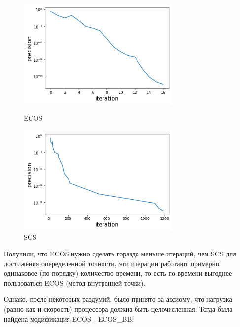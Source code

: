 \documentclass{article}
\begin{document}
\begin{figure}[h]
\begin{center}
\begin{minipage}[h]{8cm}
\includegraphics[width=8cm]{ECOS_1.png}
\caption{ECOS} %
\label{ris:experimoriginal} %
\end{minipage}
\hfill 
\begin{minipage}[h]{8cm}
\includegraphics[width=8cm]{SCS_1.png}
\caption{SCS}
\label{ris:experimcoded}
\end{minipage}
\end{center}
\end{figure}

Получили, что ECOS нужно сделать гораздо меньше итераций, чем SCS для достижения опеределенной точности, эти итерации работают примерно одинаковое (по порядку) количество времени, то есть по времени выгоднее пользоваться ECOS (метод внутренней точки).

Однако, после некоторых раздумий, было принято за аксиому, что нагрузка (равно как и скорость) процессора должна быть целочисленная. Тогда была найдена модификация ECOS - ECOS\_BB:
\end{document}

